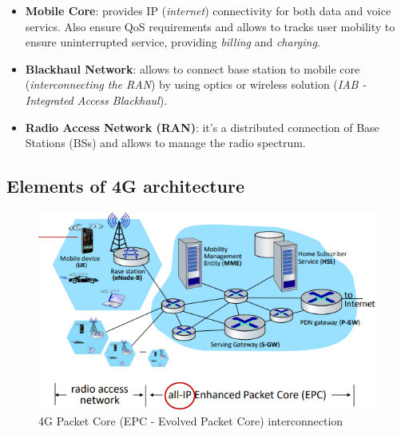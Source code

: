 \documentclass[10pt,a4paper]{report}
\theoremstyle{definition}
\begin{document}
\begin{itemize}
	\item 
	\textbf{Mobile Core}: provides IP (\textit{internet}) connectivity for both data and voice servics. Also ensure QoS requirements and allows to tracks user mobility to ensure uninterrupted service, providing \textit{billing} and \textit{charging}.
	\item 
	\textbf{Blackhaul Network}: allows to connect base station to mobile core (\textit{interconnecting the RAN}) by using optics or wireless solution (\textit{IAB - Integrated Access Blackhaul}).
	\item 
	\textbf{Radio Access Network (RAN)}: it's a distributed connection of Base Stations (BSs) and allows to manage the radio spectrum.
\end{itemize}
\subsection{Elements of 4G architecture}\label{sec:elements-of-4g-architecture}
\begin{figure}[h]
	\centering
	\includegraphics[scale=0.60]{images/Pasted image 20230309160614.png}
	\caption{4G Packet Core (EPC - Evolved Packet Core) interconnection}
	\label{}
\end{figure}
\end{document}
